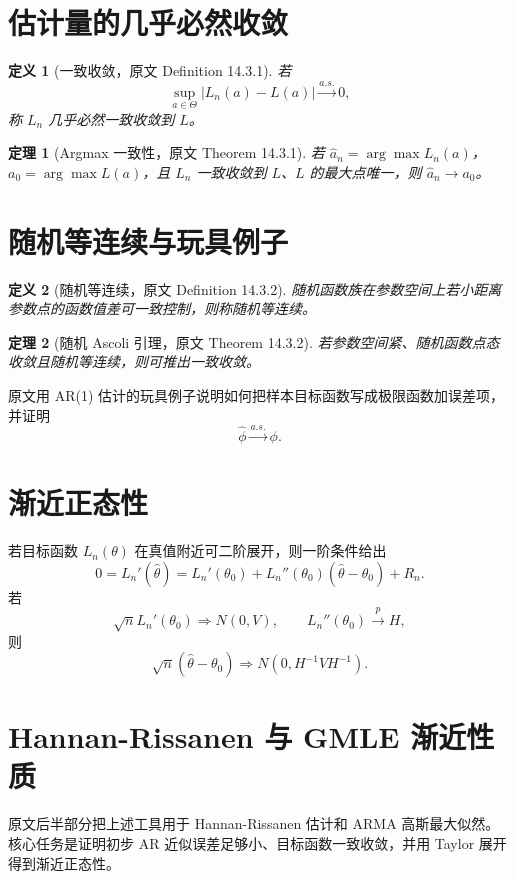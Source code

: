 \documentclass[11pt,a4paper]{ctexart}
\newtheorem{definition}{定义}[section]
\newtheorem{theorem}{定理}[section]
\begin{document}
\section{估计量的几乎必然收敛}

\begin{definition}[一致收敛，原文 Definition 14.3.1]
若
\[
  \sup_{a\in\Theta}|L_n(a)-L(a)|\xrightarrow{a.s.}0,
\]
称 \(L_n\) 几乎必然一致收敛到 \(L\)。
\end{definition}

\begin{theorem}[Argmax 一致性，原文 Theorem 14.3.1]
若 \(\hat a_n=\arg\max L_n(a)\)，\(a_0=\arg\max L(a)\)，且 \(L_n\) 一致收敛到 \(L\)、\(L\) 的最大点唯一，则 \(\hat a_n\to a_0\)。
\end{theorem}

\section{随机等连续与玩具例子}

\begin{definition}[随机等连续，原文 Definition 14.3.2]
随机函数族在参数空间上若小距离参数点的函数值差可一致控制，则称随机等连续。
\end{definition}

\begin{theorem}[随机 Ascoli 引理，原文 Theorem 14.3.2]
若参数空间紧、随机函数点态收敛且随机等连续，则可推出一致收敛。
\end{theorem}

原文用 AR(1) 估计的玩具例子说明如何把样本目标函数写成极限函数加误差项，并证明
\[
  \hat\phi\xrightarrow{a.s.}\phi.
\]

\section{渐近正态性}

若目标函数 \(L_n(\theta)\) 在真值附近可二阶展开，则一阶条件给出
\[
  0=L_n'(\hat\theta)
  =L_n'(\theta_0)+L_n''(\theta_0)(\hat\theta-\theta_0)+R_n.
\]
若
\[
  \sqrt n L_n'(\theta_0)\Rightarrow N(0,V),
  \qquad
  L_n''(\theta_0)\xrightarrow{p}H,
\]
则
\[
  \sqrt n(\hat\theta-\theta_0)\Rightarrow N(0,H^{-1}VH^{-1}).
\]

\section{Hannan-Rissanen 与 GMLE 渐近性质}

原文后半部分把上述工具用于 Hannan-Rissanen 估计和 ARMA 高斯最大似然。核心任务是证明初步 AR 近似误差足够小、目标函数一致收敛，并用 Taylor 展开得到渐近正态性。
\end{document}
